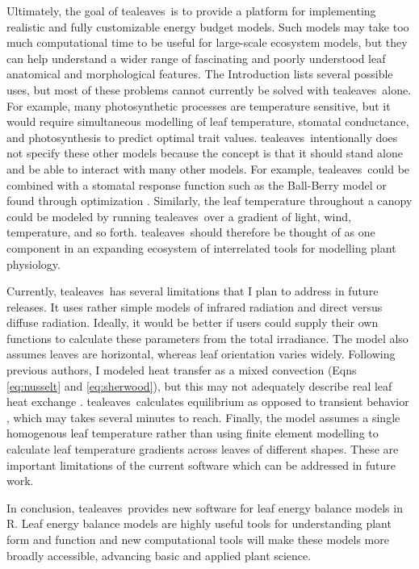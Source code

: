\documentclass[11pt, oneside]{article}
\newcommand{\pkg}[1]{{\fontseries{b}\selectfont #1}}
\newcommand{\tealeaves}{\pkg{tealeaves}}
\begin{document}
Ultimately, the goal of \tealeaves~is to provide a platform for implementing realistic and fully customizable energy budget models. Such models may take too much computational time to be useful for large-scale ecosystem models, but they can help understand a wider range of fascinating and poorly understood leaf anatomical and morphological features. The Introduction lists several possible uses, but most of these problems cannot currently be solved with \tealeaves~alone. For example, many photosynthetic processes are temperature sensitive, but it would require simultaneous modelling of leaf temperature, stomatal conductance, and photosynthesis to predict optimal trait values. \tealeaves~intentionally does not specify these other models because the concept is that it should stand alone and be able to interact with many other models. For example, \tealeaves~could be combined with a stomatal response function such as the Ball-Berry model \citep{Ball_etal_1987} or found through optimization \citep{Buckley_etal_2014, Duursma_2015, Muir_2019c}. Similarly, the leaf temperature throughout a canopy could be modeled by running \tealeaves~over a gradient of light, wind, temperature, and so forth. \tealeaves~should therefore be thought of as one component in an expanding ecosystem of interrelated tools for modelling plant physiology.

Currently, \tealeaves~has several limitations that I plan to address in future releases. It uses rather simple models of infrared radiation and direct versus diffuse radiation. Ideally, it would be better if users could supply their own functions to calculate these parameters from the total irradiance. The model also assumes leaves are horizontal, whereas leaf orientation varies widely. Following previous authors, I modeled heat transfer as a mixed convection (Eqns \ref{eq:nusselt} and \ref{eq:sherwood}), but this may not adequately describe real leaf heat exchange \citep{Roth-Nebelsick_2001}. \tealeaves~calculates equilibrium as opposed to transient behavior \citep{Vialet-Chabrand_Lawson_2019}, which may takes several minutes to reach. Finally, the model assumes a single homogenous leaf temperature rather than using finite element modelling to calculate leaf temperature gradients across leaves of different shapes. These are important limitations of the current software which can be addressed in future work.

In conclusion, \tealeaves~provides new software for leaf energy balance models in R. Leaf energy balance models are highly useful tools for understanding plant form and function and new computational tools will make these models more broadly accessible, advancing basic and applied plant science.
\end{document}
